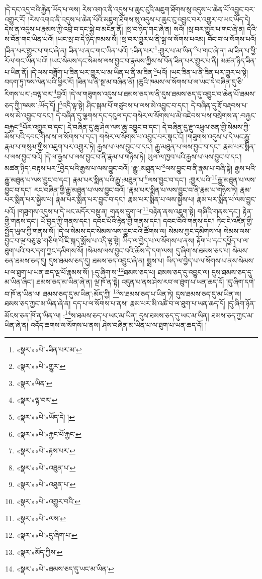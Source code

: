 །དེ་དང་འདྲ་བའི་རྐྱེན་ཡོད་པ་ལས། རེས་འགའ་ནི་འདུས་པ་ཆུང་ངུའི་མཇུག་ཐོགས་སུ་འདུས་པ་ཆེན་པོ་འབྱུང་བར་འགྱུར་རོ། །རེས་འགའ་ནི་འདུས་པ་ཆེན་པོའི་མཇུག་ཐོགས་སུ་འདུས་པ་ཆུང་ངུ་འབྱུང་བར་འགྱུར་བ་ཡང་ཡོད་དེ། དེས་ན་འདུས་པ་རྣམས་ཀྱི་འབྲི་བ་དང་སྐྱེ་བ་མངོན་ནོ། །སྲ་བ་ཉིད་གང་ཞེ་ན། སའོ། །སྲ་བར་གྱུར་པ་གང་ཞེ་ན། དེའི་ས་བོན་གང་ཡིན་པའོ། །ཡང་སྲ་བ་དེ་ཉིད་ཁམས་སོ། །སྲ་བར་གྱུར་པ་ནི་སྐྲ་ལ་སོགས་པའམ། བོང་བ་ལ་སོགས་པའོ། །ཟིན་པར་གྱུར་པ་གང་ཞེ་ན། ཟིན་པ་ནང་གང་ཡིན་པའོ། །:ཟིན་པར་\footnote{«སྣར་»«པེ་»ཟིན་པར་མ་}:གྱུར་པ་མ་ཡིན་\footnote{«སྣར་»«པེ་»གྱུར་}པ་གང་ཞེ་ན། མ་ཟིན་པ་ཕྱི་རོལ་གང་ཡིན་པའོ། །ཡང་སེམས་དང་སེམས་ལས་བྱུང་བ་རྣམས་ཀྱིས་ས་བོན་ཟིན་པར་གྱུར་པ་ནི། མཚན་ཉིད་ཟིན་པ་ཡིན་ནོ། །དེ་ལས་བཟློག་པ་ཟིན་པར་གྱུར་པ་མ་ཡིན་པ་ནི་མ་ཟིན་\footnote{«སྣར་»ཡིན་}པའོ། །ཡང་ཟིན་པ་ནི་ཟིན་པར་གྱུར་པ་སྟེ། བདག་ཏུ་ཁས་ལེན་པའི་ཕྱིར་རོ། །ཟིན་པ་ནི་སྔ་མ་བཞིན་ནོ། །ཆུའི་ཁམས་ལ་སོགས་པ་ལ་ཡང་དེ་བཞིན་དུ་ཅི་རིགས་པར་:བལྟ་བར་\footnote{«སྣར་»ལྟ་བར་}བྱའོ། །དེ་ལ་གཟུགས་འདུས་པ་ཐམས་ཅད་ལ་ནི་དུས་ཐམས་ཅད་དུ་འབྱུང་བ་ཆེན་པོ་ཐམས་ཅད་ཀྱི་ཁམས་:ཡོད་དོ། །\footnote{«སྣར་»«པེ་»ཡོད་དེ། །}འདི་ལྟ་སྟེ། ཤིང་སྐམ་པོ་གཙུབས་པ་ལས་མེ་འབྱུང་བ་དང་། དེ་བཞིན་དུ་རྡོ་བརྡབས་པ་ལས་མེ་འབྱུང་བ་དང་། དེ་བཞིན་དུ་ལྕགས་དང་དངུལ་དང་གསེར་ལ་སོགས་པ་མེ་འཇེབས་པས་བསྲེགས་ན་:བརྐྱང་བརྐྱང་\footnote{«སྣར་»«པེ་»རྐྱང་པོ་རྐྱང་}པོར་འགྱུར་བ་དང་། དེ་བཞིན་དུ་ཆུ་ཤེལ་ལས་ཆུ་འབྱུང་བ་དང་། དེ་བཞིན་དུ་རྫུ་འཕྲུལ་ཅན་གྱི་སེམས་ཀྱི་མོས་པའི་དབང་གིས་ས་ལ་སོགས་པ་དང་། གསེར་ལ་སོགས་པ་འབྱུང་བར་སྣང་ངོ། །གཟུགས་འདུས་པ་དེ་ཡང་རྒྱུ་རྣམ་པ་གསུམ་གྱིས་འཇུག་པར་འགྱུར་ཏེ། རྒྱས་པ་ལས་བྱུང་བ་དང་། རྒྱུ་མཐུན་པ་ལས་བྱུང་བ་དང་། རྣམ་པར་སྨིན་པ་ལས་བྱུང་བའོ། །དེ་ལ་རྒྱས་པ་ལས་བྱུང་བ་ནི་རྣམ་པ་གཉིས་ཏེ། ཡུལ་ལ་ཁྱབ་པའི་རྒྱས་པ་ལས་བྱུང་བ་དང་། མཚན་ཉིད་:བརྟས་པར་\footnote{«སྣར་»«པེ་»རྟས་པར་}བྱེད་པའི་རྒྱས་པ་ལས་བྱུང་བའོ། །རྒྱུ་:མཐུན་པ་\footnote{«སྣར་»«པེ་»འཐུན་པ་}ལས་བྱུང་བ་ནི་རྣམ་པ་བཞི་སྟེ། རྒྱས་པའི་རྒྱུ་མཐུན་པ་ལས་བྱུང་བ་དང་། རྣམ་པར་སྨིན་པའི་རྒྱུ་:མཐུན་པ་\footnote{«སྣར་»«པེ་»འཐུན་པ་}ལས་བྱུང་བ་དང་། :གྱུར་པའི་\footnote{«སྣར་»«པེ་»འགྱུར་བའི་}རྒྱུ་མཐུན་པ་ལས་བྱུང་བ་དང་། རང་བཞིན་གྱི་རྒྱུ་མཐུན་པ་ལས་བྱུང་བའོ། །རྣམ་པར་སྨིན་པ་ལས་བྱུང་བ་ནི་རྣམ་པ་གཉིས་ཏེ། རྣམ་པར་སྨིན་པར་སྐྱེས་པ། རྣམ་པར་སྨིན་པར་བྱུང་བ་དང་། རྣམ་པར་སྨིན་པ་ལས་སྐྱེས་པ། རྣམ་པར་སྨིན་པ་ལས་བྱུང་པའོ། །གཟུགས་འདུས་པ་དེ་ཡང་མདོར་བསྡུ་ན། གནས་དྲུག་ལ་\footnote{«སྣར་»«པེ་»ལས་}བརྟེན་ནས་འཇུག་སྟེ། གཞིའི་གནས་དང་། རྟེན་གྱི་གནས་དང་། ཡོ་བྱད་ཀྱི་གནས་དང་། དབང་པོའི་རྟེན་གྱི་གནས་དང་། དབང་བོའི་གནས་དང་། ཏིང་ངེ་འཛིན་གྱི་སྤྱོད་ཡུལ་ཀྱི་གནས་སོ། །དེ་ལ་སེམས་དང་སེམས་ལས་བྱུང་བའི་ཚོགས་ལ། སེམས་ཀྱང་དམིགས་ལ། སེམས་ལས་བྱུང་བ་ལྔ་བཅུ་རྩ་གཅིག་པོ་ཇི་སྐད་སྨོས་པ་འདི་ལྟ་སྟེ། ཡིད་ལ་བྱེད་པ་ལ་སོགས་པ་ནས། རྟོག་པ་དང་དཔྱོད་པ་ལ་ཐུག་པའི་བར་དག་ཀྱང་དམིགས་སོ། །སེམས་ལས་བྱུང་བའི་ཆོས་དེ་དག་ལས། དུ་ཞིག་ས་ཐམས་ཅད་པ། སེམས་ཅན་ཐམས་ཅད་དུ། དུས་ཐམས་ཅད་དུ། ཐམས་ཅད་འབྱུང་ཞེ་ན། སྨྲས་པ། ཡིད་ལ་བྱེད་པ་ལ་སོགས་པ་ནས་སེམས་པ་ལ་ཐུག་པ་ཡན་ཆད་ལྔ་པོ་རྣམས་སོ། །:དུ་ཞིག་ས་\footnote{«སྣར་»«པེ་»དུ་ཞིག་པ་}ཐམས་ཅད་པ། ཐམས་ཅད་དུ་འབྱུང་ལ། དུས་ཐམས་ཅད་དུ་མ་ཡིན་ཞིང་། ཐམས་ཅད་མ་ཡིན་ཞེ་ན། ལྔ་ཁོ་ན་སྟེ། འདུན་པ་ནས་ཤེས་རབ་ལ་ཐུག་པ་ཡན་ཆད་དོ། །དུ་ཞིག་དགེ་བ་ཁོ་ན་ཡིན་ལ། ཐམས་ཅད་དུ་མ་ཡིན་:མོད་ཀྱི། \footnote{«སྣར་»མོད་ཀྱིས་}ས་ཐམས་ཅད་པ་ཡིན་ཏེ། དུས་ཐམས་ཅད་དུ་མ་ཡིན་ལ། ཐམས་ཅད་ཀྱང་མ་ཡིན་ཞེ་ན། དད་པ་ལ་སོགས་པ་ནས། རྣམ་པར་མི་འཚེ་བ་ལ་ཐུག་པ་ཡན་ཆད་དོ། །དུ་ཞིག་ཉོན་མོངས་ཅན་ཁོ་ན་ཡིན་ལ། :\footnote{«སྣར་»«པེ་»ཐམས་ཅད་དུ་ཡང་མ་ཡིན་}ས་ཐམས་ཅད་པ་ཡང་མ་ཡིན། དུས་ཐམས་ཅད་དུ་ཡང་མ་ཡིན། ཐམས་ཅད་ཀྱང་མ་ཡིན་ཞེ་ན། འདོད་ཆགས་ལ་སོགས་པ་ནས། ཤེས་བཞིན་མ་ཡིན་པ་ལ་ཐུག་པ་ཡན་ཆད་དོ། །
